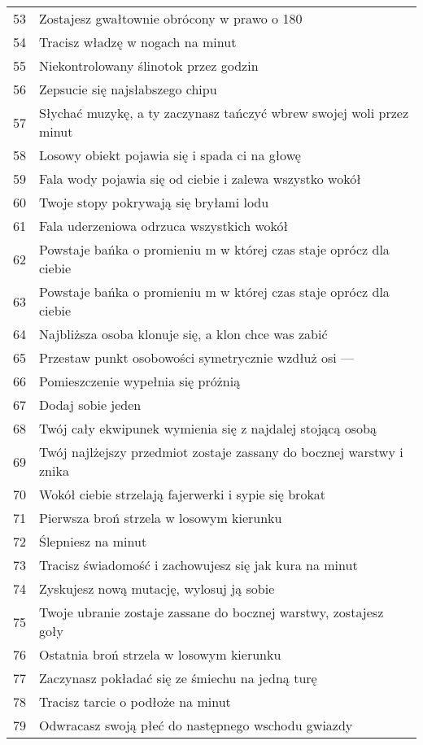 \begin{longtabu}{ l l }
53			&	Zostajesz gwałtownie obrócony w prawo o 180\textdegree \\
54			&	Tracisz władzę w nogach na \dxx minut \\
55			&	Niekontrolowany ślinotok przez \dvi godzin \\
56			&	Zepsucie się najsłabszego chipu	\\
57			&	Słychać muzykę, a ty zaczynasz tańczyć wbrew swojej woli przez \dvi minut \\
58			&	Losowy obiekt pojawia się i spada ci na głowę \\
59			&	Fala wody pojawia się od ciebie i zalewa wszystko wokół \\
60			&	Twoje stopy pokrywają się bryłami lodu \\
61			&	Fala uderzeniowa odrzuca wszystkich wokół \\
62			&	Powstaje bańka o promieniu \diiii m w której czas staje oprócz dla ciebie \\
63			&	Powstaje bańka o promieniu \dxx m w której czas staje oprócz dla ciebie \\
64			&	Najbliższa osoba klonuje się, a klon chce was zabić \\
65			&	Przestaw punkt osobowości symetrycznie wzdłuż osi \abh --- \abt \\
66			&	Pomieszczenie wypełnia się próżnią \\
67			&	Dodaj sobie jeden \abnkp \\ 
68			&	Twój cały ekwipunek wymienia się z najdalej stojącą osobą \\
69			&	Twój najlżejszy przedmiot zostaje zassany do bocznej warstwy i znika \\
70			&	Wokół ciebie strzelają fajerwerki i sypie się brokat \\
71			&	Pierwsza broń strzela w losowym kierunku \\
72			&	Ślepniesz na \dvi minut \\
73			&	Tracisz świadomość i zachowujesz się jak kura na \dxx minut \\
74			&	Zyskujesz nową mutację, wylosuj ją sobie \\
75			&	Twoje ubranie zostaje zassane do bocznej warstwy, zostajesz goły \\
76			&	Ostatnia broń strzela w losowym kierunku \\
77			&	Zaczynasz pokładać się ze śmiechu na jedną turę \\
78			&	Tracisz tarcie o podłoże na \diiii minut \\
79			&	Odwracasz swoją płeć do następnego wschodu gwiazdy \\

\end{longtabu}
